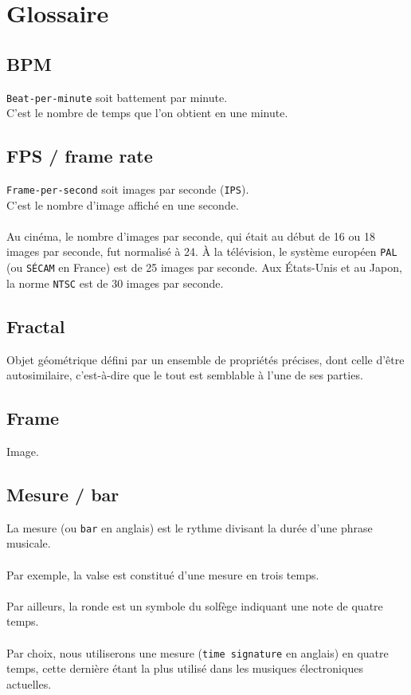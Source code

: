 \documentclass[]{article}
\begin{document}
\section{Glossaire}

\subsection{BPM}

\texttt{Beat-per-minute} soit battement par minute.\\
C’est le nombre de temps que l’on obtient en une minute.

\subsection{FPS / frame rate}

\texttt{Frame-per-second} soit images par seconde (\texttt{IPS}).\\
C’est le nombre d’image affiché en une seconde.\\
\\
Au cinéma, le nombre d'images par seconde, qui était au début de 16 ou 18 images par seconde, fut normalisé à 24. À la télévision, le système européen \texttt{PAL} (ou \texttt{SÉCAM} en France) est de 25 images par seconde. Aux États-Unis et au Japon, la norme \texttt{NTSC} est de 30 images par seconde.

\subsection{Fractal}

Objet géométrique défini par un ensemble de propriétés précises, dont celle d’être autosimilaire, c’est-à-dire que le tout est semblable à l’une de ses parties.

\subsection{Frame}

Image.

\subsection{Mesure / bar}

La mesure (ou \texttt{bar} en anglais) est le rythme divisant la durée d’une phrase musicale.\\
\\
Par exemple, la valse est constitué d’une mesure en trois temps.\\
\\
Par ailleurs, la ronde est un symbole du solfège indiquant une note de quatre temps.\\
\\
Par choix, nous utiliserons une mesure (\texttt{time signature} en anglais) en quatre temps, cette dernière étant la plus utilisé dans les musiques électroniques actuelles.
\end{document}
